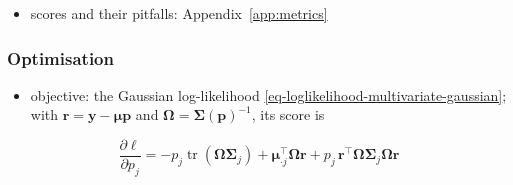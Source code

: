 \documentclass[pdflatex, sn-nature]{sn-jnl}
\theoremstyle{thmstyleone}%
\theoremstyle{thmstyletwo}%
\theoremstyle{thmstylethree}%
\begin{document}
\begin{itemize}
        captures: Table~\ref{tab:descriptors})
  \begin{itemize}
    \item composition: \(H^{\star}\), effective number of types, \(\lVert\boldsymbol{p}\rVert_{2}^{2}\)
    \item mean geometry: pairwise cosines, Euclidean gaps, condition number of \(\boldsymbol{\mu}\)
    \item conditioning of \(\boldsymbol{\Sigma}(\boldsymbol{p})\)
    \item tangent Fisher information and the share carried by the covariance block
          \cite{bessonFisherInformationMatrix2013}
    \item edge density of each precision graph
    \item separation: MixSim overlap, mean pairwise Hellinger distance, affine-invariant Riemannian distance
  \end{itemize}
  \item scores and their pitfalls: Appendix~\ref{app:metrics}
\end{itemize}

\subsubsection{Optimisation}
\label{sec:optimisation}

\begin{itemize}
  \item objective: the Gaussian log-likelihood \eqref{eq-loglikelihood-multivariate-gaussian}; with
        \(\boldsymbol{r}=\boldsymbol{y}-\boldsymbol{\mu}\boldsymbol{p}\) and \(\boldsymbol{\Omega}=\boldsymbol{\Sigma}(\boldsymbol{p})^{-1}\), its score is
\end{itemize}

\begin{equation}
  \frac{\partial\ell}{\partial p_{j}}
  =-p_{j}\operatorname{tr}(\boldsymbol{\Omega}\boldsymbol{\Sigma}_{j})
  +\boldsymbol{\mu}_{\cdot j}^{\top}\boldsymbol{\Omega}\boldsymbol{r}
  +p_{j}\,\boldsymbol{r}^{\top}\boldsymbol{\Omega}\boldsymbol{\Sigma}_{j}\boldsymbol{\Omega}\boldsymbol{r}
  \label{eq-derivative-log-likelihood-unconstrained}
\end{equation}
\end{document}
